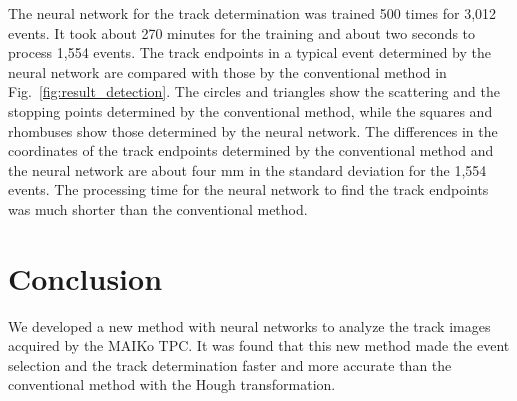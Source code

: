 \documentclass{jps-cp}
\begin{document}
The neural network for the track determination was trained 500 times for 3,012 events.
It took about 270 minutes for the training and about two seconds to process 1,554 events.
The track endpoints in a typical event determined by the neural network are compared with those
by the conventional method in Fig.~\ref{fig:result_detection}.
The circles and triangles show the scattering and the stopping points determined by the conventional method,
while the squares and rhombuses show those determined by the neural network.
The differences in the coordinates of the track endpoints determined by the conventional method
and the neural network are about four mm in the standard deviation for the 1,554 events.
The processing time for the neural network to find the track endpoints was much shorter than the conventional method.


\section{Conclusion}
We developed a new method with neural networks to analyze the track images acquired by the MAIKo TPC.
It was found that this new method made the event selection and the track determination faster and more accurate
than the conventional method with the Hough transformation.
\end{document}
